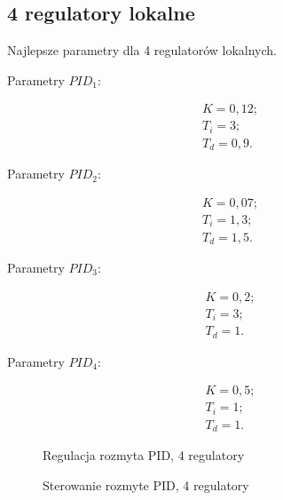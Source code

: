 \subsection{4 regulatory lokalne}

Najlepsze parametry dla 4 regulatorów lokalnych.

Parametry $PID_1$:

\begin{equation}
\begin{matrix}
    	K = 0,12;\\
    	T_i = 3;\\
    	T_d = 0,9.
\end{matrix}
\end{equation}

Parametry $PID_2$:

\begin{equation}
\begin{matrix}
    	K = 0,07;\\
    	T_i = 1,3;\\
    	T_d = 1,5.
\end{matrix}
\end{equation}

Parametry $PID_3$:

\begin{equation}
\begin{matrix}
    	K = 0,2;\\
    	T_i = 3;\\
    	T_d = 1.
\end{matrix}
\end{equation}

Parametry $PID_4$:

\begin{equation}
\begin{matrix}
    	K = 0,5;\\
    	T_i = 1;\\
    	T_d = 1.
\end{matrix}
\end{equation}


\begin{figure}[H]
\centering

\caption{Regulacja rozmyta PID, 4 regulatory}
\end{figure}

\begin{figure}[H]
\centering

\caption{Sterowanie rozmyte PID, 4 regulatory}
\end{figure}

